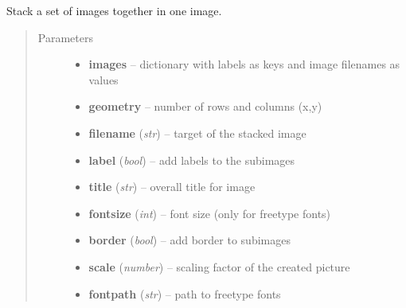 \documentclass[letterpaper,10pt,english]{sphinxmanual}
\begin{document}
\begin{fulllineitems}
\label{ImageUtils:ImageUtils.stackImages}
Stack a set of images together in one image.
\begin{quote}\begin{description}
\item[{Parameters}] \leavevmode\begin{itemize}
\item {} 
\textbf{images} -- dictionary with labels as keys and image filenames as values

\item {} 
\textbf{geometry} -- number of rows and columns (x,y)

\item {} 
\textbf{filename} (\emph{str}) -- target of the stacked image

\item {} 
\textbf{label} (\emph{bool}) -- add labels to the subimages

\item {} 
\textbf{title} (\emph{str}) -- overall title for image

\item {} 
\textbf{fontsize} (\emph{int}) -- font size (only for freetype fonts)

\item {} 
\textbf{border} (\emph{bool}) -- add border to subimages

\item {} 
\textbf{scale} (\emph{number}) -- scaling factor of the created picture

\item {} 
\textbf{fontpath} (\emph{str}) -- path to freetype fonts

\end{itemize}

\end{description}\end{quote}

\end{fulllineitems}

\end{document}
